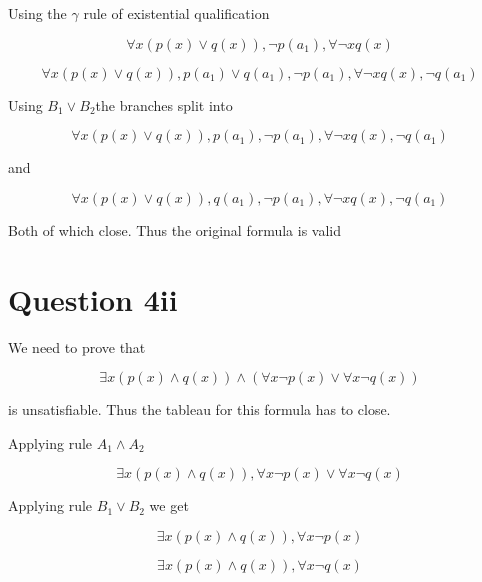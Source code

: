 \documentclass[10pt,a4paper]{article}
\begin{document}
Using the $\gamma$ rule of existential qualification

\begin{equation}
 \forall x(p(x)\vee q(x)),\neg p(a_1),\forall\neg xq(x)
\end{equation}

\begin{equation}
 \forall x(p(x)\vee q(x)),p(a_1)\vee q(a_1),\neg p(a_1),\forall\neg xq(x),\neg q(a_1)
 \end{equation}
 
 Using $B_1\vee B_2$the branches split into
 
 \begin{equation}
 \forall x(p(x)\vee q(x)),p(a_1),\neg p(a_1),\forall\neg xq(x),\neg q(a_1)
 \end{equation}
 
 and
 
 \begin{equation}
 \forall x(p(x)\vee q(x)), q(a_1),\neg p(a_1),\forall\neg xq(x),\neg q(a_1)
 \end{equation}
 
 Both of which close. Thus the original formula is valid

 
 
 \section{Question 4ii}
 
 
 We need to prove that
 
 \begin{equation}
  \exists x(p(x)\wedge q(x))\wedge(\forall x\neg p(x) \vee \forall x \neg q(x))
 \end{equation}

 is unsatisfiable. Thus the tableau for this formula has to close.
 
 Applying rule $A_1\wedge A_2$
 
 \begin{equation}
  \exists x(p(x)\wedge q(x)),\forall x\neg p(x) \vee \forall x \neg q(x)
 \end{equation}
 
 Applying rule $B_1 \vee B_2$ we get 
 
 \begin{equation}
 \label{421}
 \exists x(p(x)\wedge q(x)),\forall x \neg p(x)
 \end{equation}

 \begin{equation}
 \label{422}
  \exists x(p(x)\wedge q(x)),\forall x \neg q(x)
 \end{equation}
 
\end{document}
